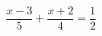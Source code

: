 \begin{ex}
	\begin{condition}
		\( \dfrac{x-3}{5}+\dfrac{x+2}{4}=\dfrac{1}{2} \)
	\end{condition}
\end{ex}